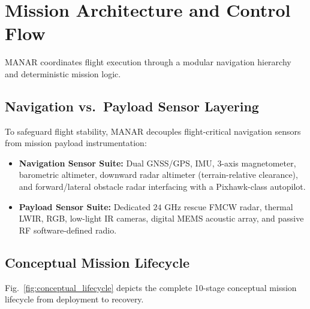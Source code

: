 \section{Mission Architecture and Control Flow}

MANAR coordinates flight execution through a modular navigation hierarchy and deterministic mission logic.

\subsection{Navigation vs.\ Payload Sensor Layering}
To safeguard flight stability, MANAR decouples flight-critical navigation sensors from mission payload instrumentation:
\begin{itemize}
    \item \textbf{Navigation Sensor Suite:} Dual GNSS/GPS, IMU, 3-axis magnetometer, barometric altimeter, downward radar altimeter (terrain-relative clearance), and forward/lateral obstacle radar interfacing with a Pixhawk-class autopilot.
    \item \textbf{Payload Sensor Suite:} Dedicated $24\text{ GHz}$ rescue FMCW radar, thermal LWIR, RGB, low-light IR cameras, digital MEMS acoustic array, and passive RF software-defined radio.
\end{itemize}

\subsection{Conceptual Mission Lifecycle}
Fig.~\ref{fig:conceptual_lifecycle} depicts the complete 10-stage conceptual mission lifecycle from deployment to recovery.

